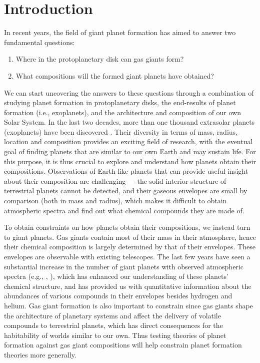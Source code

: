 \chapter{Introduction}

In recent years, the field of giant planet formation has aimed to answer two fundamental questions:

\begin{enumerate}
\item Where in the protoplanetary disk can gas giants form?
\item What compositions will the formed giant planets have obtained?
\end{enumerate} 

We can start uncovering the answers to these questions through a combination of studying planet formation in protoplanetary disks, the end-results of planet formation (i.e., exoplanets), and the architecture and composition of our own Solar System. In the last two decades, more than one thousand extrasolar planets (exoplanets)
have been discovered \citep{batalha14}. Their diversity in terms of mass, radius, location and composition
\citep{lissauer14} provides an exciting field of research, with the eventual goal of finding planets that are
similar to our own Earth and may sustain life. For this purpose, it is thus crucial to explore
and understand how planets obtain their compositions. Observations of Earth-like planets
that can provide useful insight about their composition are challenging --- the solid interior
structure of terrestrial planets cannot be detected, and their gaseous envelopes are small by
comparison (both in mass and radius), which makes it difficult to obtain atmospheric spectra
and find out what chemical compounds they are made of. 

To obtain constraints on how planets obtain their compositions, we instead turn to giant planets. Gas giants contain most
of their mass in their atmosphere, hence their chemical composition is largely determined by that
of their envelopes. These envelopes are observable with existing telescopes. The last few years have seen a substantial increase in the number of
giant planets with observed atmospheric spectra (e.g., \citealt{debes13}, \citealt{kreidberg15}), which has enhanced our
understanding of these planets' chemical structure, and has provided us with quantitative
information about the abundances of various compounds in their envelopes besides hydrogen
and helium. Gas giant formation is also important to constrain since gas giants shape the architecture of planetary systems and affect the
delivery of volatile compounds to terrestrial planets, which has direct consequences for the
habitability of worlds similar to our own. Thus testing theories of planet formation against
gas giant compositions will help constrain planet formation theories more generally.


